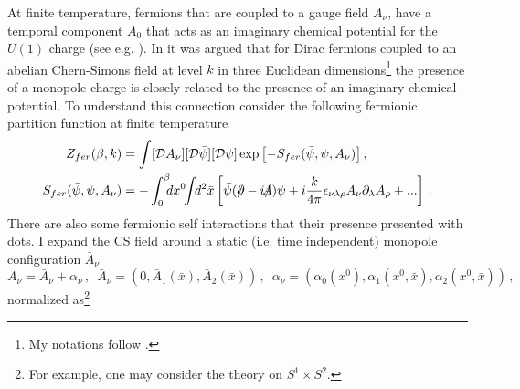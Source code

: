 \documentclass[twoside]{article}
\begin{document}
At finite temperature, fermions that are coupled to a gauge field $A_\nu$, have a temporal component $A_0$ that acts as an imaginary chemical potential for the $U(1)$ charge (see e.g. \cite{ZinnJustin:2002ru}). 
In \cite{Filothodoros:2016txa} it was argued that for Dirac fermions coupled to an abelian Chern-Simons field at level $k$ in three Euclidean  dimensions\footnote{My notations follow \cite{ZinnJustin:2002ru}.} the presence of a monopole charge is closely related to the presence of an imaginary chemical potential. To understand this connection consider the following fermionic partition function at finite temperature
\begin{align}
\label{DiracCSPF}
Z_{fer}(\beta,k)&=\int [{\cal D}A_\nu][{\cal D}\bar\psi][{\cal D}\psi]\exp{\left[-S_{fer}(\bar\psi,\psi,A_\nu)\right]}\,,\\
\label{Sf}
S_{fer}(\bar\psi,\psi,A_\nu)&=-\int_0^{\beta}\!\!\!dx^0\!\!\int \!\!d^2\bar{x}\left[\bar{\psi}(\slash\!\!\!\partial -i\slash\!\!\!\!A)\psi+i\frac{k}{4\pi}\epsilon_{\nu\lambda\rho}A_\nu\partial_\lambda A_\rho+...\right]\,.
\end{align}
There are also some fermionic self interactions that their presence presented with dots. I expand the CS field around a static (i.e. time independent) monopole configuration $\bar{A}_\nu$ \cite{Fosco:1998cq}
\begin{equation}
\label{Aexpansion}
A_\nu=\bar{A}_\nu+\alpha_\nu\,,\,\,\,\bar{A}_\nu=(0,\bar{A}_1(\bar{x}),\bar{A}_2(\bar{x}))\,,\,\,\, \alpha_\nu=(\alpha_0(x^0),\alpha_1(x^0,\bar{x}),\alpha_2(x^0,\bar{x}))\,,
\end{equation}
normalized as\footnote{For example, one may consider the theory on $S^1\times S^2$.}
\end{document}
